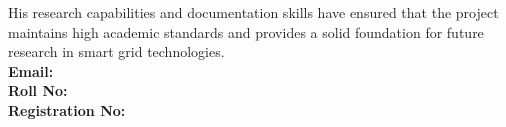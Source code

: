 His research capabilities and documentation skills have ensured that the project maintains high academic standards and provides a solid foundation for future research in smart grid technologies.
\\
\noindent
\textbf{Email:} \GetEmailFive \quad\\ \textbf{Roll No:} \GetRollFive \quad \\ \textbf{Registration No:} \GetRegFive
\fi

\cleardoublepage